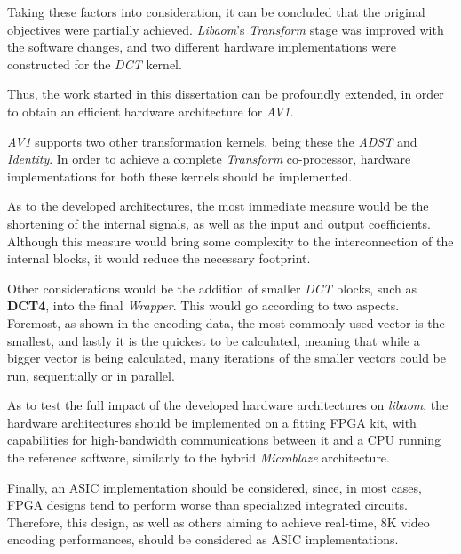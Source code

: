 Taking these factors into consideration, it can be concluded that the original objectives were partially achieved. \emph{Libaom}'s \emph{Transform} stage was improved with the software changes, and two different hardware implementations were constructed for the \emph{DCT} kernel. 

Thus, the work started in this dissertation can be profoundly extended, in order to obtain an efficient hardware architecture for \emph{AV1}.

\emph{AV1} supports two other transformation kernels, being these the \emph{ADST} and \emph{Identity}. In order to achieve a complete \emph{Transform} co-processor, hardware implementations for both these kernels should be implemented.


As to the developed architectures, the most immediate measure would be the shortening of the internal signals, as well as the input and output coefficients. Although this measure would bring some complexity to the interconnection of the internal blocks, it would reduce the necessary footprint.

Other considerations would be the addition of smaller \emph{DCT} blocks, such as \textbf{DCT4}, into the final \emph{Wrapper}. This would go according to two aspects. Foremost, as shown in the encoding data, the most commonly used vector is the smallest, and lastly it is the quickest to be calculated, meaning that while a bigger vector is being calculated, many iterations of the smaller vectors could be run, sequentially or in parallel.

As to test the full impact of the developed hardware architectures on \emph{libaom}, the hardware architectures should be implemented on a fitting FPGA kit, with capabilities for high-bandwidth communications between it and a CPU running the reference software, similarly to the hybrid \emph{Microblaze} architecture.

Finally, an ASIC implementation should be considered, since, in most cases, FPGA designs tend to perform worse than specialized integrated circuits. Therefore, this design, as well as others aiming to achieve real-time, 8K video encoding performances, should be considered as ASIC implementations.

